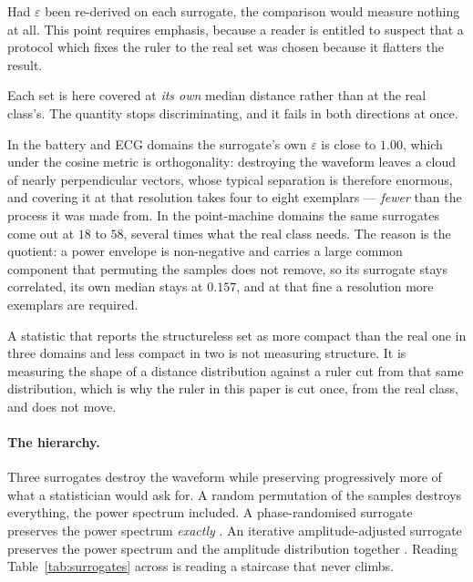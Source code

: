 \documentclass[10pt]{article}
\theoremstyle{plain}
\theoremstyle{definition}
\theoremstyle{remark}
\begin{document}
Had $\varepsilon$ been re-derived on each surrogate, the comparison would
measure nothing at all. This point requires emphasis, because a reader is entitled to suspect that
a protocol which fixes the ruler to the real set was chosen because it
flatters the result.

\begin{center}\small

\end{center}

Each set is here covered at \emph{its own} median distance rather than at the
real class's. The quantity stops discriminating, and it fails in both
directions at once.

In the battery and ECG domains the surrogate's own $\varepsilon$ is close to
$1.00$, which under the cosine metric is orthogonality: destroying the waveform
leaves a cloud of nearly perpendicular vectors, whose typical separation is
therefore enormous, and covering it at that resolution takes four to eight
exemplars --- \emph{fewer} than the process it was made from. In the
point-machine domains the same surrogates come out at $18$ to $58$, several
times what the real class needs. The reason is the quotient: a power envelope
is non-negative and carries a large common component that permuting the samples
does not remove, so its surrogate stays correlated, its own median stays at
$0.157$, and at that fine a resolution more exemplars are required.

A statistic that reports the structureless set as more compact than the real
one in three domains and less compact in two is not measuring structure. It is
measuring the shape of a distance distribution against a ruler cut from that
same distribution, which is why the ruler in this paper is cut once, from the
real class, and does not move.

\paragraph{The hierarchy.}
Three surrogates destroy the waveform while preserving progressively more of
what a statistician would ask for. A random permutation of the samples destroys
everything, the power spectrum included. A phase-randomised surrogate preserves
the power spectrum \emph{exactly} \citep{theiler1992surrogate}. An iterative
amplitude-adjusted surrogate preserves the power spectrum and the amplitude
distribution together \citep{schreiber1996improved}. Reading
Table~\ref{tab:surrogates} across is reading a staircase that never climbs.
\end{document}
